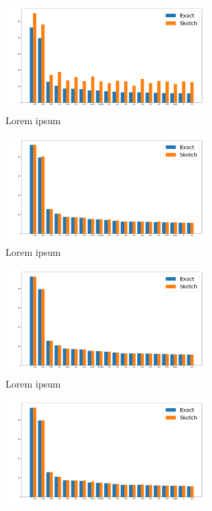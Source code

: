 \documentclass[shortpaper]{revdetua}
\begin{document}
\begin{figure}[]
    \begin{subfigure}[t]{0.5\textwidth}
        \includegraphics[height=1.6in]{englishAlice100_5.png}
        \caption{Lorem ipsum}
    \end{subfigure}
    \begin{subfigure}[t]{0.5\textwidth}
        \includegraphics[height=1.6in]{englishAlice1000_5.png}
        \caption{Lorem ipsum}
    \end{subfigure}
    \begin{subfigure}[t]{0.5\textwidth}
        \includegraphics[height=1.6in]{englishAlice10000_5.png}
        \caption{Lorem ipsum}
    \end{subfigure}
    \begin{subfigure}[t]{0.5\textwidth}
        \includegraphics[height=1.6in]{englishAlice1000_6.png}

\end{subfigure}
\end{figure}
\end{document}
